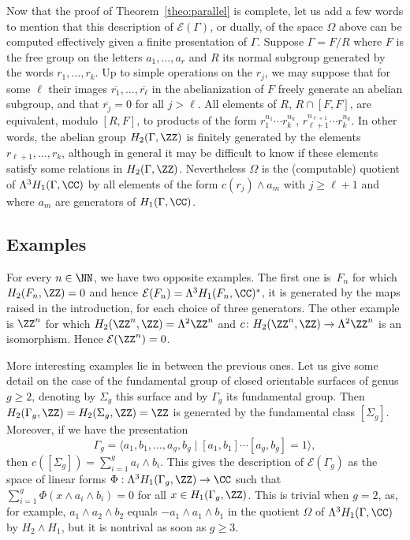 Now that the proof of Theorem~\ref{theo:parallel} is complete, let us add
a few words to mention that this description of $\mathcal{E}(\Gamma)$, or
dually, of the space $\Omega$ above can be computed effectively given a
finite presentation of $\Gamma$. Suppose $\Gamma=F/R$ where $F$ is the free
group on the letters $a_1,\ldots,a_r$ and $R$ its normal subgroup generated
by the words $r_1,\ldots,r_k$. Up to simple operations on the $r_j$, we may
suppose that for some $\ell$ their images
$\overline{r_1},\ldots,\overline{r_\ell}$ in the abelianization of $F$ freely
generate an abelian subgroup, and that $\overline{r_j}=0$ for all $j>\ell$.
All elements of $R$, \resp $R\cap[F,F]$, are equivalent, modulo $[R,F]$, to
products of the form $r_1^{n_1}\cdots r_k^{n_k}$,
\resp $r_{\ell+1}^{n_{\ell+1}}\cdots r_k^{n_k}$.
In other words, the abelian group $H_2(\Gamma,\ZZ)$ is finitely generated by
the elements $r_{\ell+1},\ldots,r_k$, although in general it may be difficult
to know if these elements satisfy some relations in $H_2(\Gamma,\ZZ)$.
Nevertheless $\Omega$ is the (computable) quotient of
$\Lambda^3H_1(\Gamma,\CC)$ by all elements of the form $c(r_j)\wedge a_m$
with $j\geq\ell+1$ and where $a_m$ are generators of $H_1(\Gamma,\CC)$.

\subsection{Examples}
For every $n\in \NN$, we have two opposite examples. The first one is~$F_n$
for which $H_2(F_n,\ZZ)=0$ and hence
$\mathcal{E}(F_n)=\Lambda^3H_1(F_n,\CC)^*$, it is generated by the maps
raised in the introduction, for each choice of three generators.
The other example is $\ZZ^n$ for which $H_2(\ZZ^n,\ZZ)=\Lambda^2\ZZ^n$ and
$c\colon H_2(\ZZ^n,\ZZ)\to \Lambda^2 \ZZ^n$ is an isomorphism.
Hence $\mathcal{E}(\ZZ^n)=0$.

More interesting examples lie in between the previous ones. Let us give
some detail on the case of the fundamental group of closed orientable
surfaces of genus $g\geq 2$, denoting by $\Sigma_g$ this surface and by
$\Gamma_g$ its fundamental group.
Then $H_2(\Gamma_g,\ZZ)=H_2(\Sigma_g,\ZZ)=\ZZ$ is generated by the fundamental
class $[\Sigma_g]$. Moreover, if we have the presentation
\[ \Gamma_g=\langle a_1,b_1,\ldots,a_g,b_g \mid
[a_1,b_1]\cdots[a_g,b_g]=1\rangle, \]
then $c([\Sigma_g])=\sum_{i=1}^g a_i\wedge b_i$. This gives the description
of $\mathcal{E}(\Gamma_g)$ as the space of linear forms
$\Phi :\Lambda^3 H_1(\Gamma_g,\ZZ)\to\CC$ such that
$\sum_{i=1}^g \Phi(x\wedge a_i\wedge b_i)=0$
for all $x\in H_1(\Gamma_g,\ZZ)$. This is trivial when $g=2$, as, for
example, $a_1\wedge a_2\wedge b_2$ equals $-a_1\wedge a_1\wedge b_1$ in
the quotient $\Omega$ of $\Lambda^3H_1(\Gamma,\CC)$ by $H_2\wedge H_1$, but
it is nontrival as soon as $g\geq 3$.

